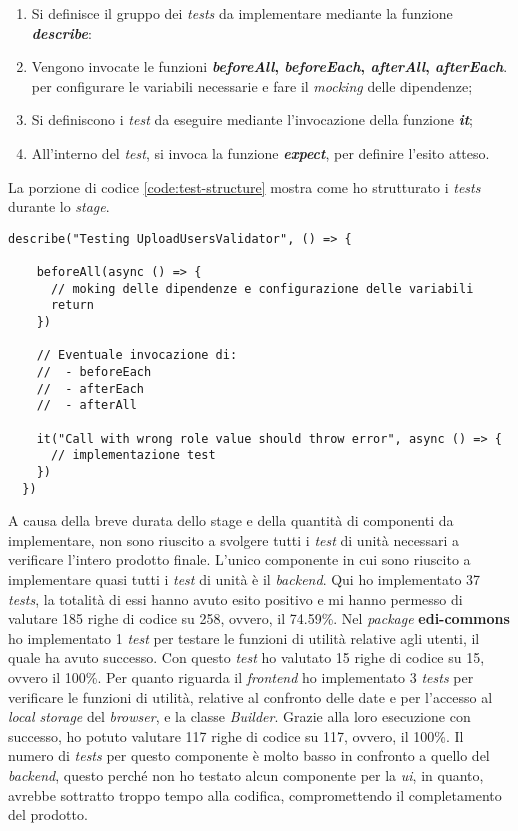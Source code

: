 \begin{enumerate}
  \item Si definisce il gruppo dei \emph{tests} da implementare mediante la funzione \textbf{\emph{describe}}:
  \item Vengono invocate le funzioni \textbf{\emph{beforeAll}, \emph{beforeEach}, \emph{afterAll}, \emph{afterEach}}. per configurare le variabili necessarie e fare il \emph{mocking} delle dipendenze;
  \item Si definiscono i \emph{test} da eseguire mediante l'invocazione della funzione \emph{\textbf{it}};
  \item All'interno del \emph{test}, si invoca la funzione \emph{\textbf{expect}}, per definire l'esito atteso.
\end{enumerate}

La porzione di codice \ref{code:test-structure} mostra come ho strutturato i \emph{tests} durante lo \emph{stage}.
\newpage
\begin{lstlisting}[caption=Esempio di struttura di \emph{test}, label={code:test-structure}, captionpos=b]
  describe("Testing UploadUsersValidator", () => {

    beforeAll(async () => {
      // moking delle dipendenze e configurazione delle variabili
      return 
    })

    // Eventuale invocazione di:
    //  - beforeEach
    //  - afterEach
    //  - afterAll

    it("Call with wrong role value should throw error", async () => {
      // implementazione test
    })
  })
\end{lstlisting}


A causa della breve durata dello stage e della quantità di componenti da implementare, non sono riuscito a svolgere tutti i \emph{test} di unità necessari a verificare l'intero prodotto finale.
L'unico componente in cui sono riuscito a implementare quasi tutti i \emph{test} di unità è il \emph{\gls{backend}}.
Qui ho implementato 37 \emph{tests}, la totalità di essi hanno avuto esito positivo e mi hanno permesso di valutare 185 righe di codice su 258, ovvero, il 74.59\%.
Nel \emph{package} \textbf{edi-commons} ho implementato 1 \emph{test} per testare le funzioni di utilità relative agli utenti, il quale ha avuto successo. 
Con questo \emph{test} ho valutato 15 righe di codice su 15, ovvero il 100\%.
Per quanto riguarda il \emph{\gls{frontend}} ho implementato 3 \emph{tests} per verificare le funzioni di utilità, relative al confronto delle date e per l'accesso al \emph{local storage} del \emph{browser}, e la classe \emph{Builder}.
Grazie alla loro esecuzione con successo, ho potuto valutare 117 righe di codice su 117, ovvero, il 100\%.
Il numero di \emph{tests} per questo componente è molto basso in confronto a quello del \emph{\gls{backend}}, questo perché non ho testato alcun componente per la \emph{\acrshort{ui}}, in quanto, avrebbe sottratto troppo tempo alla codifica, compromettendo il completamento del prodotto.

